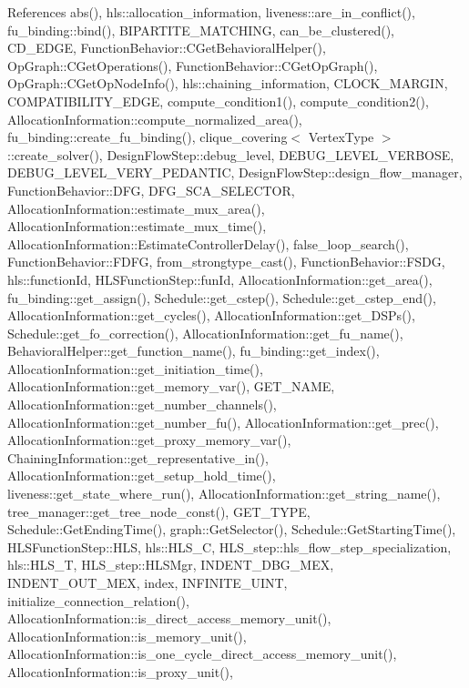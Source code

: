 References abs(), hls\+::allocation\+\_\+information, liveness\+::are\+\_\+in\+\_\+conflict(), fu\+\_\+binding\+::bind(), B\+I\+P\+A\+R\+T\+I\+T\+E\+\_\+\+M\+A\+T\+C\+H\+I\+NG, can\+\_\+be\+\_\+clustered(), C\+D\+\_\+\+E\+D\+GE, Function\+Behavior\+::\+C\+Get\+Behavioral\+Helper(), Op\+Graph\+::\+C\+Get\+Operations(), Function\+Behavior\+::\+C\+Get\+Op\+Graph(), Op\+Graph\+::\+C\+Get\+Op\+Node\+Info(), hls\+::chaining\+\_\+information, C\+L\+O\+C\+K\+\_\+\+M\+A\+R\+G\+IN, C\+O\+M\+P\+A\+T\+I\+B\+I\+L\+I\+T\+Y\+\_\+\+E\+D\+GE, compute\+\_\+condition1(), compute\+\_\+condition2(), Allocation\+Information\+::compute\+\_\+normalized\+\_\+area(), fu\+\_\+binding\+::create\+\_\+fu\+\_\+binding(), clique\+\_\+covering$<$ Vertex\+Type $>$\+::create\+\_\+solver(), Design\+Flow\+Step\+::debug\+\_\+level, D\+E\+B\+U\+G\+\_\+\+L\+E\+V\+E\+L\+\_\+\+V\+E\+R\+B\+O\+SE, D\+E\+B\+U\+G\+\_\+\+L\+E\+V\+E\+L\+\_\+\+V\+E\+R\+Y\+\_\+\+P\+E\+D\+A\+N\+T\+IC, Design\+Flow\+Step\+::design\+\_\+flow\+\_\+manager, Function\+Behavior\+::\+D\+FG, D\+F\+G\+\_\+\+S\+C\+A\+\_\+\+S\+E\+L\+E\+C\+T\+OR, Allocation\+Information\+::estimate\+\_\+mux\+\_\+area(), Allocation\+Information\+::estimate\+\_\+mux\+\_\+time(), Allocation\+Information\+::\+Estimate\+Controller\+Delay(), false\+\_\+loop\+\_\+search(), Function\+Behavior\+::\+F\+D\+FG, from\+\_\+strongtype\+\_\+cast(), Function\+Behavior\+::\+F\+S\+DG, hls\+::function\+Id, H\+L\+S\+Function\+Step\+::fun\+Id, Allocation\+Information\+::get\+\_\+area(), fu\+\_\+binding\+::get\+\_\+assign(), Schedule\+::get\+\_\+cstep(), Schedule\+::get\+\_\+cstep\+\_\+end(), Allocation\+Information\+::get\+\_\+cycles(), Allocation\+Information\+::get\+\_\+\+D\+S\+Ps(), Schedule\+::get\+\_\+fo\+\_\+correction(), Allocation\+Information\+::get\+\_\+fu\+\_\+name(), Behavioral\+Helper\+::get\+\_\+function\+\_\+name(), fu\+\_\+binding\+::get\+\_\+index(), Allocation\+Information\+::get\+\_\+initiation\+\_\+time(), Allocation\+Information\+::get\+\_\+memory\+\_\+var(), G\+E\+T\+\_\+\+N\+A\+ME, Allocation\+Information\+::get\+\_\+number\+\_\+channels(), Allocation\+Information\+::get\+\_\+number\+\_\+fu(), Allocation\+Information\+::get\+\_\+prec(), Allocation\+Information\+::get\+\_\+proxy\+\_\+memory\+\_\+var(), Chaining\+Information\+::get\+\_\+representative\+\_\+in(), Allocation\+Information\+::get\+\_\+setup\+\_\+hold\+\_\+time(), liveness\+::get\+\_\+state\+\_\+where\+\_\+run(), Allocation\+Information\+::get\+\_\+string\+\_\+name(), tree\+\_\+manager\+::get\+\_\+tree\+\_\+node\+\_\+const(), G\+E\+T\+\_\+\+T\+Y\+PE, Schedule\+::\+Get\+Ending\+Time(), graph\+::\+Get\+Selector(), Schedule\+::\+Get\+Starting\+Time(), H\+L\+S\+Function\+Step\+::\+H\+LS, hls\+::\+H\+L\+S\+\_\+C, H\+L\+S\+\_\+step\+::hls\+\_\+flow\+\_\+step\+\_\+specialization, hls\+::\+H\+L\+S\+\_\+T, H\+L\+S\+\_\+step\+::\+H\+L\+S\+Mgr, I\+N\+D\+E\+N\+T\+\_\+\+D\+B\+G\+\_\+\+M\+EX, I\+N\+D\+E\+N\+T\+\_\+\+O\+U\+T\+\_\+\+M\+EX, index, I\+N\+F\+I\+N\+I\+T\+E\+\_\+\+U\+I\+NT, initialize\+\_\+connection\+\_\+relation(), Allocation\+Information\+::is\+\_\+direct\+\_\+access\+\_\+memory\+\_\+unit(), Allocation\+Information\+::is\+\_\+memory\+\_\+unit(), Allocation\+Information\+::is\+\_\+one\+\_\+cycle\+\_\+direct\+\_\+access\+\_\+memory\+\_\+unit(), Allocation\+Information\+::is\+\_\+proxy\+\_\+unit(), 